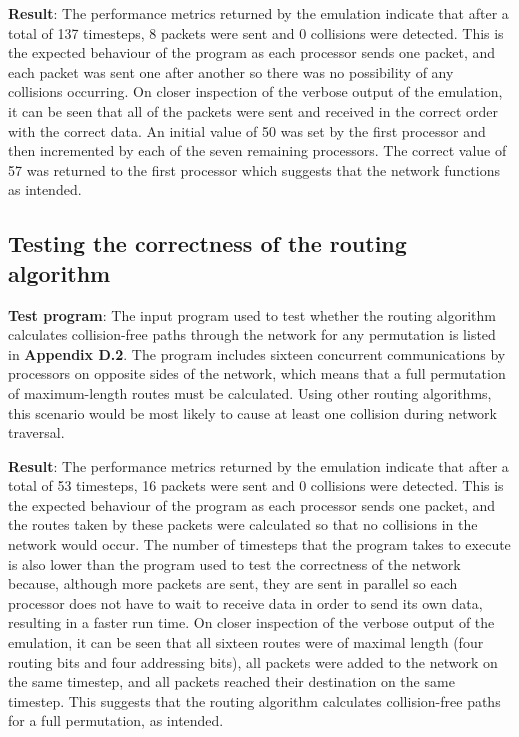 \documentclass[a4paper, 12pt]{article}
\begin{document}
\noindent\textbf{Result}: The performance metrics returned by the emulation indicate that after a total of 137 timesteps, 8 packets were sent and 0 collisions were detected. This is the expected behaviour of the program as each processor sends one packet, and each packet was sent one after another so there was no possibility of any collisions occurring. On closer inspection of the verbose output of the emulation, it can be seen that all of the packets were sent and received in the correct order with the correct data. An initial value of 50 was set by the first processor and then incremented by each of the seven remaining processors. The correct value of 57 was returned to the first processor which suggests that the network functions as intended. 

\subsection{Testing the correctness of the routing algorithm}

\textbf{Test program}: The input program used to test whether the routing algorithm calculates collision-free paths through the network for any permutation is listed in \textbf{Appendix D.2}. The program includes sixteen concurrent communications by processors on opposite sides of the network, which means that a full permutation of maximum-length routes must be calculated. Using other routing algorithms, this scenario would be most likely to cause at least one collision during network traversal.

\noindent\textbf{Result}: The performance metrics returned by the emulation indicate that after a total of 53 timesteps, 16 packets were sent and 0 collisions were detected. This is the expected behaviour of the program as each processor sends one packet, and the routes taken by these packets were calculated so that no collisions in the network would occur. The number of timesteps that the program takes to execute is also lower than the program used to test the correctness of the network because, although more packets are sent, they are sent in parallel so each processor does not have to wait to receive data in order to send its own data, resulting in a faster run time. On closer inspection of the verbose output of the emulation, it can be seen that all sixteen routes were of maximal length (four routing bits and four addressing bits), all packets were added to the network on the same timestep, and all packets reached their destination on the same timestep. This suggests that the routing algorithm calculates collision-free paths for a full permutation, as intended.
\end{document}
